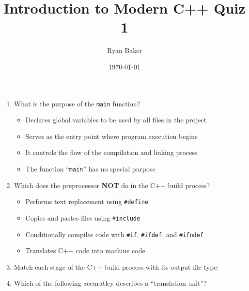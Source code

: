 \documentclass{article}
\title{Introduction to Modern C++ Quiz 1}
\author{Ryan Baker}
\date{\today}
\begin{document}
\maketitle

\begin{enumerate}
	\item What is the purpose of the \texttt{main} function?
	\begin{itemize}
		\item[a)] Declares global variables to be used by all files in the project
		\item[b)] {Serves as the entry point where program execution begins}
		\item[c)] It controls the flow of the compilation and linking process
		\item[d)] The function ``\texttt{main}'' has no special purpose
	\end{itemize}
	\vspace{1em}
	\item Which does the preprocessor \textbf{NOT} do in the C++ build process?
	\begin{itemize}
		\item[a)] Performs text replacement using \textcolor{BurntOrange}{\texttt{\#define}}
		\item[b)] Copies and pastes files using \textcolor{BurntOrange}{\texttt{\#include}}
		\item[c)] Conditionally compiles code with \textcolor{BurntOrange}{\texttt{\#if}}, \textcolor{BurntOrange}{\texttt{\#ifdef}}, and \textcolor{BurntOrange}{\texttt{\#ifndef}}
		\item[d)] {Translates C++ code into machine code}
	\end{itemize}
	\vspace{1em}
	\item Match each stage of the C++ build process with its output file type:
	\begin{center}{}\end{center}
	\item Which of the following accuratley describes a ``translation unit''?

\end{enumerate}
\end{document}

